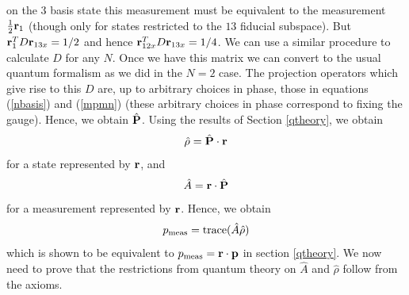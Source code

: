 \documentclass[10pt,twocolumn]{article}
\begin{document}
on the $3$ basis state this measurement must be equivalent to the
measurement ${1\over 2}{\bf r}_1$ (though only for states restricted to
the $13$ fiducial subspace).  But ${\bf r}_1^T D{\bf r}_{13x}=1/2$ and
hence ${\bf r}_{12x}^T D {\bf r}_{13x}=1/4$.
We can use a similar procedure to calculate $D$ for any $N$.  Once we
have this matrix we can convert to the usual quantum formalism as we did
in the $N=2$ case.  The projection operators which give rise to this $D$
are, up to arbitrary choices in phase, those in equations (\ref{nbasis})
and (\ref{mpmn}) (these arbitrary choices in phase correspond to fixing
the gauge).  Hence, we obtain $\hat{\bf P}$.
Using the results of Section \ref{qtheory}, we obtain
\begin{equation}\label{convertstate}
\hat{\rho}=\hat{\bf P}\cdot{\bf r}
\end{equation}
for a state represented by $\bf r$, and
\begin{equation}\label{convertmeas}
\hat{A}={\bf r}\cdot\hat{\bf P}
\end{equation}
for a measurement represented by $\bf r$.  Hence, we obtain
\begin{equation}
p_{\rm meas}={\rm trace}(\hat{A}\hat{\rho})
\end{equation}
which is shown to be equivalent to $p_{\rm meas}={\bf r}\cdot{\bf p}$ in
section \ref{qtheory}. We now need
to prove that the restrictions from quantum theory on $\hat{A}$ and
$\hat{\rho}$ follow from the axioms.
\end{document}
